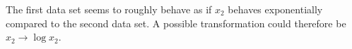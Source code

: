 \begin{answer}
    The first data set seems to roughly behave as if $x_2$ behaves exponentially compared to the second data set.
    A possible transformation could therefore be $x_2\rightarrow \log x_2$.
\end{answer}

